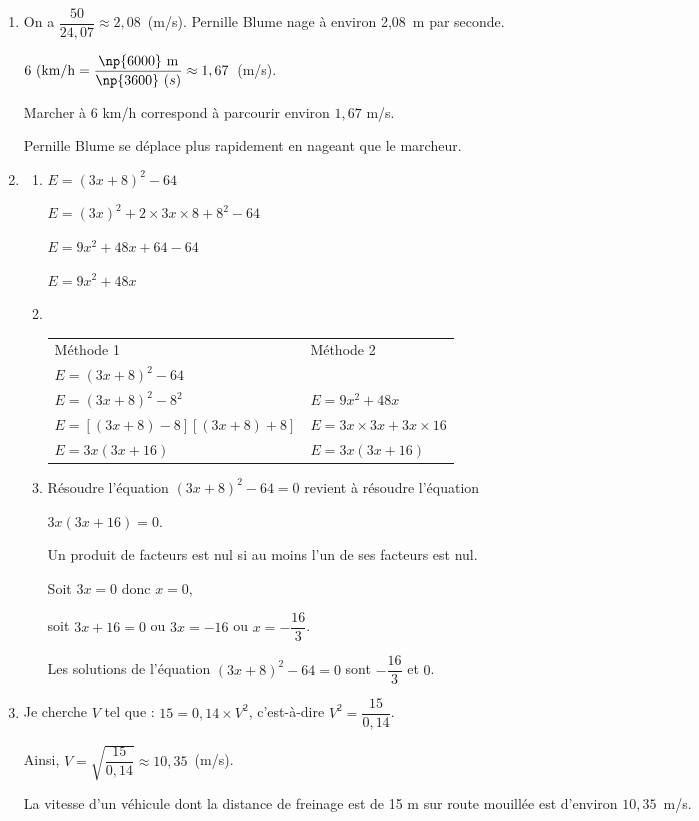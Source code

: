 
\medskip

\begin{enumerate}
\item On a $\dfrac{50}{24,07} \approx  2,08$~(m/s). Pernille Blume nage à environ 2,08~m par seconde.

$6~(\text{km/h} = \dfrac{\np{6000}~\text{m}}{\np{3600}~(s)} \approx  1,67$~(m/s).

Marcher à 6 km/h correspond à parcourir environ $1,67$ m/s.

Pernille Blume se déplace plus rapidement en nageant que le marcheur.
\item 
	\begin{enumerate}
		\item $E = (3x + 8)^2 - 64$
		
$E = (3x)^2 + 2 \times 3x \times 8 + 8^2 - 64$
		
$E = 9x^2 + 48x + 64 - 64$
		
$E = 9x^2 + 48x$
		\item ~
		
\begin{tabularx}{\linewidth}{X X}
Méthode 1 &Méthode 2\\
$E = (3x + 8)^2 - 64$				&\\
$E = (3x + 8)^2 - 8^2$				&$E = 9x^2 + 48x$\\
$E = [(3x + 8) - 8][ (3x + 8) + 8]$	&$E = 3x \times 3x + 3x \times 16$\\
$E = 3x(3x + 16)$					&$E = 3x(3x + 16)$\\
\end{tabularx}
		\item Résoudre l'équation $(3x + 8)^2 - 64 = 0$ revient à résoudre l'équation
		
$3x(3x + 16) = 0$.

Un produit de facteurs est nul si au moins l'un de ses facteurs est nul.

Soit $3x = 0$ donc $x = 0$, 

soit $3x+16 = 0$ ou $3x = -16$ ou $x = - \dfrac{16}{3}$.

Les solutions de l'équation $(3x + 8)^2 - 64 = 0$ sont $- \dfrac{16}{3}$ et $0$.
	\end{enumerate}
\item  Je cherche $V$ tel que : $15 = 0,14 \times  V^2$, c'est-à-dire $V^2 = \dfrac{15}{0,14}$.

Ainsi, $V = \sqrt{\dfrac{15}{0,14}} \approx 10,35$~(m/s).

La vitesse d'un véhicule dont la distance de freinage est de 15 m sur route
mouillée est d'environ $10,35$~m/s.

\end{enumerate}

\bigskip

